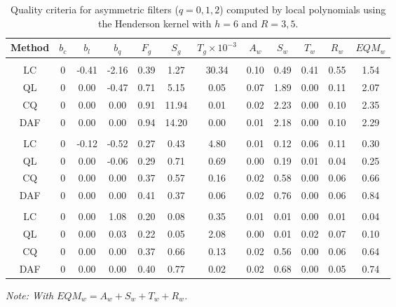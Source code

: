 \documentclass[
]{article}
\newcommand\1{\mathds{1}}
\begin{document}
\begin{table}[!h]
\caption{\label{tab-criteriaLp} Quality criteria for asymmetric filters ($q=0,1,2$) computed by local polynomials using the Henderson kernel with $h=6$ and $R=3,5$.}
\centering
\begin{tabular}[t]{cccccccccccc}
\toprule
Method & $b_c$ & $b_l$ & $b_q$ & $F_g$ & $S_g$ & $T_g \times 10^{-3}$ & $A_w$ & $S_w$ & $T_w$ & $R_w$ & $EQM_w$\\
\midrule
\addlinespace[0.3em]
\multicolumn{12}{l}{\textbf{$q=0$}}\\
\hspace{1em}LC & 0 & -0.41 & -2.16 & 0.39 & 1.27 & 30.34 & 0.10 & 0.49 & 0.41 & 0.55 & 1.54\\
\hspace{1em}QL & 0 & 0.00 & -0.47 & 0.71 & 5.15 & 0.05 & 0.07 & 1.89 & 0.00 & 0.11 & 2.07\\
\hspace{1em}CQ & 0 & 0.00 & 0.00 & 0.91 & 11.94 & 0.01 & 0.02 & 2.23 & 0.00 & 0.10 & 2.35\\
\hspace{1em}DAF & 0 & 0.00 & 0.00 & 0.94 & 14.20 & 0.00 & 0.01 & 2.18 & 0.00 & 0.10 & 2.29\\
\addlinespace[0.3em]
\multicolumn{12}{l}{\textbf{$q=1$}}\\
\hspace{1em}LC & 0 & -0.12 & -0.52 & 0.27 & 0.43 & 4.80 & 0.01 & 0.12 & 0.06 & 0.11 & 0.30\\
\hspace{1em}QL & 0 & 0.00 & -0.06 & 0.29 & 0.71 & 0.69 & 0.00 & 0.19 & 0.01 & 0.04 & 0.25\\
\hspace{1em}CQ & 0 & 0.00 & 0.00 & 0.37 & 0.57 & 0.16 & 0.02 & 0.58 & 0.00 & 0.06 & 0.66\\
\hspace{1em}DAF & 0 & 0.00 & 0.00 & 0.41 & 0.37 & 0.06 & 0.02 & 0.76 & 0.00 & 0.06 & 0.84\\
\addlinespace[0.3em]
\multicolumn{12}{l}{\textbf{$q=2$}}\\
\hspace{1em}LC & 0 & 0.00 & 1.08 & 0.20 & 0.08 & 0.35 & 0.01 & 0.01 & 0.00 & 0.01 & 0.04\\
\hspace{1em}QL & 0 & 0.00 & 0.03 & 0.22 & 0.05 & 2.08 & 0.00 & 0.01 & 0.02 & 0.07 & 0.10\\
\hspace{1em}CQ & 0 & 0.00 & 0.00 & 0.37 & 0.66 & 0.13 & 0.02 & 0.56 & 0.00 & 0.06 & 0.64\\
\hspace{1em}DAF & 0 & 0.00 & 0.00 & 0.40 & 0.77 & 0.02 & 0.02 & 0.68 & 0.00 & 0.05 & 0.74\\
\bottomrule
\end{tabular}

\textit{Note: With $EQM_w=A_w + S_w + T_w + R_w$.}
\end{table}
\end{document}
